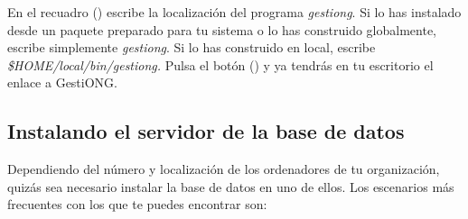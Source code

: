 En el recuadro
{\textquotesingle}
({\textquotesingle})
escribe la localización del programa \textit{gestiong}. Si lo has
instalado desde un paquete preparado para tu sistema o lo has
construido globalmente, escribe simplemente \textit{gestiong}. Si lo
has construido en local, escribe \textit{\$HOME/local/bin/gestiong.}
Pulsa el botón
{\textquotesingle}
({\textquotesingle}) y ya
tendrás en tu escritorio el enlace a GestiONG.

\clearpage\subsection{Instalando el servidor de la base de datos}
\label{ref:instalandosqlserver}Dependiendo del número y localización
de los ordenadores de tu organización, quizás sea necesario
instalar la base de datos en uno de ellos. Los escenarios más
frecuentes con los que te puedes encontrar son:

